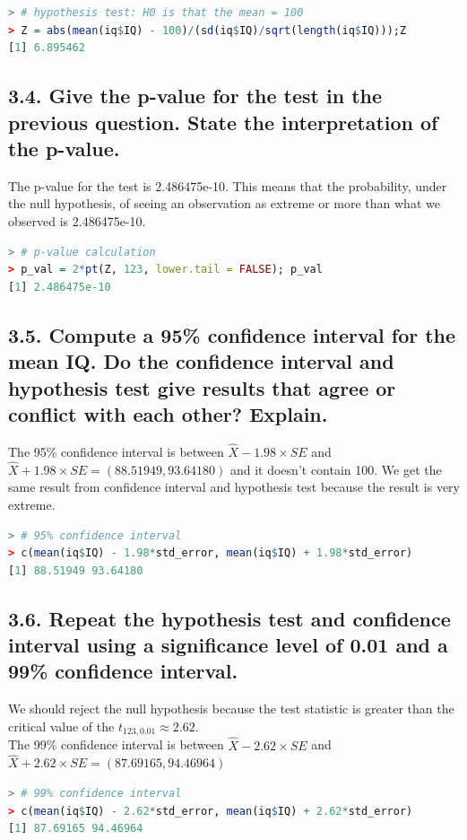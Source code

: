 \documentclass[11pt]{article}
\begin{document}
\begin{lstlisting}[language=R]
> # hypothesis test: H0 is that the mean = 100
> Z = abs(mean(iq$IQ) - 100)/(sd(iq$IQ)/sqrt(length(iq$IQ)));Z
[1] 6.895462
\end{lstlisting}

\subsection*{3.4. Give the p-value for the test in the previous question. State the interpretation of the p-value.}
The p-value for the test is 2.486475e-10. This means that the probability, under the null hypothesis, of seeing an observation as extreme or more than what we observed is 2.486475e-10.
\begin{lstlisting}[language=R]
> # p-value calculation 
> p_val = 2*pt(Z, 123, lower.tail = FALSE); p_val
[1] 2.486475e-10
\end{lstlisting}


\subsection*{3.5. Compute a 95\% confidence interval for the mean IQ. Do the confidence interval and hypothesis test give results that agree or conflict with each other? Explain.}
The 95\% confidence interval is between $\hat{X} - 1.98 \times SE$ and $\hat{X} + 1.98 \times SE = (88.51949, 93.64180)$ and it doesn't contain 100. We get the same result from confidence interval and hypothesis test because the result is very extreme. 
\begin{lstlisting}[language=R]
> # 95% confidence interval
> c(mean(iq$IQ) - 1.98*std_error, mean(iq$IQ) + 1.98*std_error)
[1] 88.51949 93.64180
\end{lstlisting}


\subsection*{3.6. Repeat the hypothesis test and confidence interval using a significance level of 0.01 and a 99\% confidence interval.}
We should reject the null hypothesis because the test statistic is greater than the critical value of the $t_{123,0.01} \approx 2.62$.
\\
The 99\% confidence interval is between $\hat{X} - 2.62 \times SE$ and $\hat{X} + 2.62 \times SE = (87.69165, 94.46964)$
\begin{lstlisting}[language=R]
> # 99% confidence interval
> c(mean(iq$IQ) - 2.62*std_error, mean(iq$IQ) + 2.62*std_error)
[1] 87.69165 94.46964
\end{lstlisting}
\end{document}
